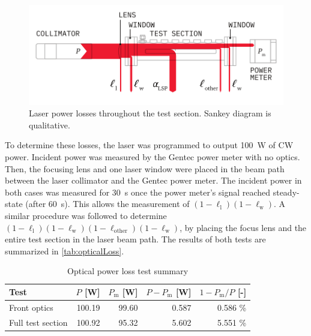                 \begin{figure}[h]
                    \centering
                    \includegraphics[]{assets/3 design/sankeyOptics}
                    \caption[Laser power losses throughout the test section]{Laser power losses throughout the test section. Sankey diagram is qualitative.}
                    \label{fig:sankeyOptics}
                \end{figure}

                To determine these losses, the laser was programmed to output \qty{100}{W} of CW power. Incident power was measured by the Gentec power meter with no optics. Then, the focusing lens and one laser window were placed in the beam path between the laser collimator and the Gentec power meter. The incident power in both cases was measured for 30~s once the power meter's signal reached steady-state (after 60~s). This allows the measurement of $(1-\ell_\mathrm{l})(1-\ell_\mathrm{w})$. A similar procedure was followed to determine $(1-\ell_\mathrm{l})(1-\ell_\mathrm{w})(1-\ell_\mathrm{other})(1-\ell_\mathrm{w})$, by placing the focus lens and the entire test section in the laser beam path. The results of both tests are summarized in \autoref{tab:opticalLoss}.

                \begin{table}[h]
                    \centering
                    \caption{Optical power loss test summary}
                    \label{tab:opticalLoss}
                    \begin{tabular}{lrrrr}
                        \toprule
                        Test        & $P$ [W]   & $P_\mathrm{m}$ [W]    & $P-P_\mathrm{m}$ [W]  & $1-P_\mathrm{m}/P$ [-] \\
                        \midrule
                        Front optics    & 100.19    & 99.60 & 0.587  & 0.586 \% \\
                        Full test section    & 100.92    & 95.32 & 5.602  & 5.551 \% \\
                        \bottomrule
                    \end{tabular}
                \end{table}

